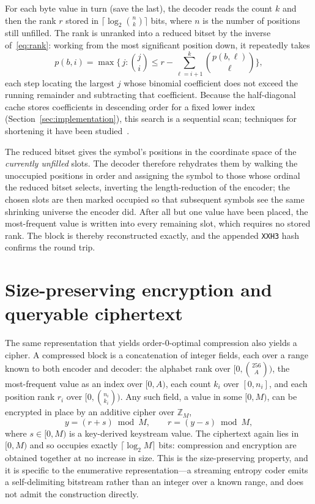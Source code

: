 \documentclass[entropy,article,submit,oneauthor,pdftex]{Definitions/mdpi}
\begin{document}
For each byte value in turn (save the last), the decoder reads the count $k$ and
then the rank $r$ stored in $\lceil\log_2\binom{n}{k}\rceil$ bits, where $n$ is
the number of positions still unfilled. The rank is unranked into a reduced
bitset by the inverse of~\eqref{eq:rank}: working from the most significant
position down, it repeatedly takes
\begin{equation*}
    p(b,i)=\max\Big\{\,j:\binom{j}{i}\leqslant r-\!\!\sum^{k}_{\ell=i+1}\binom{p(b,\ell)}{\ell}\Big\},
\end{equation*}
each step locating the largest $j$ whose binomial coefficient does not exceed the
running remainder and subtracting that coefficient. Because the half-diagonal
cache stores coefficients in descending order for a fixed lower index
(Section~\ref{sec:implementation}), this search is a sequential scan; techniques
for shortening it have been studied~\cite{rulevskiy2022}.

The reduced bitset gives the symbol's positions in the coordinate space of the
\emph{currently unfilled} slots. The decoder therefore rehydrates them by walking
the unoccupied positions in order and assigning the symbol to those whose ordinal
the reduced bitset selects, inverting the length-reduction of the encoder; the
chosen slots are then marked occupied so that subsequent symbols see the same
shrinking universe the encoder did. After all but one value have been placed, the
most-frequent value is written into every remaining slot, which requires no
stored rank. The block is thereby reconstructed exactly, and the appended
\texttt{XXH3} hash~\cite{collet2022} confirms the round trip.

\section{Size-preserving encryption and queryable ciphertext}\label{sec:encryption}
The same representation that yields order-$0$-optimal compression also yields a
cipher. A compressed block is a concatenation of integer fields, each over a range
known to both encoder and decoder: the alphabet rank over $[0,\binom{256}{A})$, the
most-frequent value as an index over $[0,A)$, each count $k_i$ over $[0,n_i]$, and
each position rank $r_i$ over $[0,\binom{n_i}{k_i})$. Any such field, a value in
some $[0,M)$, can be encrypted in place by an additive cipher over $\mathbb{Z}_M$,
\begin{equation}
    y = (r + s)\bmod M, \qquad r = (y - s)\bmod M,
\end{equation}
where $s\in[0,M)$ is a key-derived keystream value. The ciphertext again lies in
$[0,M)$ and so occupies exactly $\lceil\log_2 M\rceil$ bits: compression and
encryption are obtained together at no increase in size. This is the
size-preserving property, and it is specific to the enumerative representation---a
streaming entropy coder emits a self-delimiting bitstream rather than an integer
over a known range, and does not admit the construction directly.
\end{document}
